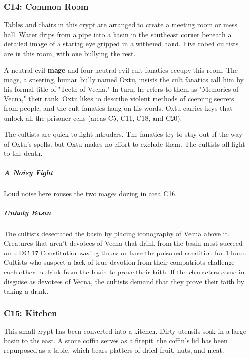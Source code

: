 \documentclass[10pt,a4paper,twoside,bg=print,twocolumn,openany,nodeprecatedcode]{dndbook}
\begin{document}
\subsubsection{C14: Common Room}
\begin{DndReadAloud}{}
Tables and chairs in this crypt are arranged to create a meeting room or mess hall. Water drips from a pipe into a basin in the southeast corner beneath a detailed image of a staring eye gripped in a withered hand. Five robed cultists are in this room, with one bullying the rest.

\end{DndReadAloud}

A neutral evil \textbf{mage} and four neutral evil cult fanatics occupy this room. The mage, a sneering, human bully named Oxtu, insists the cult fanatics call him by his formal title of "Teeth of Vecna." In turn, he refers to them as "Memories of Vecna," their rank. Oxtu likes to describe violent methods of coercing secrets from people, and the cult fanatics hang on his words. Oxtu carries keys that unlock all the prisoner cells (areas C5, C11, C18, and C20).

The cultists are quick to fight intruders. The fanatics try to stay out of the way of Oxtu's spells, but Oxtu makes no effort to exclude them. The cultists all fight to the death.

\subparagraph{A Noisy Fight}
Loud noise here rouses the two mages dozing in area C16.

\subparagraph{Unholy Basin}
The cultists desecrated the basin by placing iconography of Vecna above it. Creatures that aren't devotees of Vecna that drink from the basin must succeed on a DC 17 Constitution saving throw or have the poisoned condition for 1 hour. Cultists who suspect a lack of true devotion from their compatriots challenge each other to drink from the basin to prove their faith. If the characters come in disguise as devotees of Vecna, the cultists demand that they prove their faith by taking a drink.

\subsubsection{C15: Kitchen}
\begin{DndReadAloud}{}
This small crypt has been converted into a kitchen. Dirty utensils soak in a large basin to the east. A stone coffin serves as a firepit; the coffin's lid has been repurposed as a table, which bears platters of dried fruit, nuts, and meat.

\end{DndReadAloud}
\end{document}
